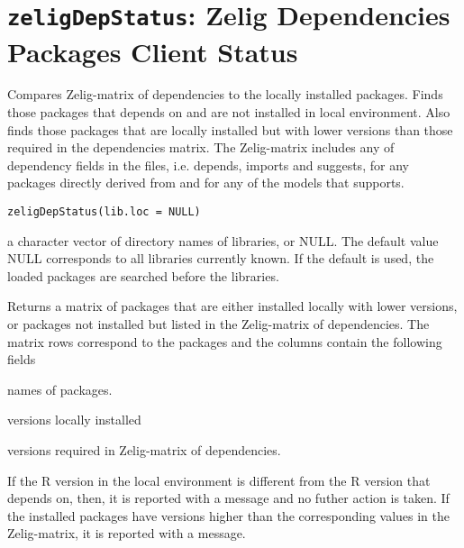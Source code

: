  \section{{\tt zeligDepStatus}: Zelig Dependencies Packages Client Status}\label{ss:zeligDepStatus}
\begin{Description}\relax
Compares Zelig-matrix of dependencies to the locally installed
packages. Finds those packages that  depends on and are not
installed in local environment. Also finds those packages that are
locally installed but with lower versions than those required in the
dependencies matrix.
The Zelig-matrix includes any of dependency fields in the
 files, i.e. depends, imports and suggests,
for any packages directly derived from  and for any of the models that  supports.
\end{Description}
\begin{Usage}
\begin{verbatim}
zeligDepStatus(lib.loc = NULL)
\end{verbatim}
\end{Usage}
\begin{Arguments}
\begin{ldescription}
\item[\code{lib.loc}] a character vector of directory names 
of  libraries, or NULL.
The default value NULL corresponds to all libraries currently known. If the default is used, the loaded packages are searched before the libraries. 
\end{ldescription}
\end{Arguments}
\begin{Value}
Returns a matrix of packages that are either installed locally 
with lower versions, or packages not installed but listed in the
Zelig-matrix of dependencies.  The matrix rows correspond to the packages and 
the columns contain the following fields
\begin{ldescription}
\item[\code{Package}] names of packages.
\item[\code{Version}] versions locally installed
\item[\code{Zideal}] versions required in Zelig-matrix of dependencies.
\end{ldescription}
\end{Value}
\begin{Note}\relax
If the R version in the local environment is different from the R
version that   
depends on, then, it is reported with a message and no futher action is taken. 
If the installed packages have versions higher than the corresponding 
values in the Zelig-matrix, it is reported with a message.
\end{Note}
